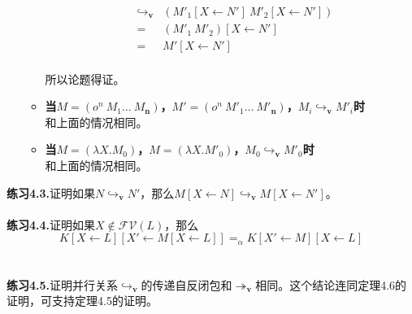 \documentclass{book}
\def\v{\mathbf{v}}
\def\lianxi{\noindent \makebox[0pt][r]{$\rhd$} \textbf}
\begin{document}
\begin{adjustwidth}{20pt}{20pt}
\begin{itemize}
\begin{itemize}
$$\begin{array}{lcl}
   & \hookrightarrow_{\mathbf{v}} &(M'_1[X\leftarrow N']\ M'_2[X\leftarrow N'])\\
   & = & (M'_1\ M'_2)[X\leftarrow N']\\
   & = & M'[X\leftarrow N']
  \end{array}
  $$\\
  所以论题得证。
  \item \textbf{当$M=(o^n\ M_1\ldots\ M_\textbf{n})$，$M'=(o^n\ M'_1\ldots\ M'_\textbf{n})$，$M_i\hookrightarrow_{\mathbf{v}} M'_i$时}\\
  和上面的情况相同。
  \item \textbf{当$M=(\lambda X.M_0)$，$M=(\lambda X.M'_0)$，$M_0\hookrightarrow_{\mathbf{v}} M'_0$时}\\
  和上面的情况相同。
  
 \end{itemize}
\end{itemize}
\end{adjustwidth}
\lianxi{练习4.3.}证明如果$N\hookrightarrow_\v N'$，那么$M[X\leftarrow N]\hookrightarrow_\v M[X\leftarrow N']$。\\\\
\lianxi{练习4.4.}证明如果$X\not\in\mathcal{FV}(L)$，那么$$K[X\leftarrow L][X'\leftarrow M[X\leftarrow L]]=_\alpha K[X'\leftarrow M][X\leftarrow L]$$\\\\
\lianxi{练习4.5.}证明并行关系$\hookrightarrow_\v$的传递自反闭包和$\twoheadrightarrow_\v$相同。这个结论连同定理4.6的证明，可支持定理4.5的证明。
\end{document}
